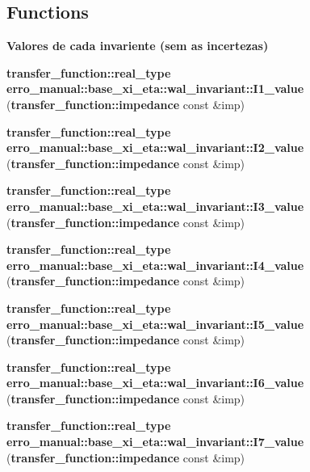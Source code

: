 \subsection*{Functions}
\begin{Indent}{\bf Valores de cada invariente (sem as incertezas)}\par
\begin{CompactItemize}
\item 
{\bf transfer\_\-function::real\_\-type} \textbf{erro\_\-manual::base\_\-xi\_\-eta::wal\_\-invariant::I1\_\-value} ({\bf transfer\_\-function::impedance} const \&imp)\label{namespaceerro__manual_1_1base__xi__eta_1_1wal__invariant_ef17311f213159798c257c41cb0017bc}

\item 
{\bf transfer\_\-function::real\_\-type} \textbf{erro\_\-manual::base\_\-xi\_\-eta::wal\_\-invariant::I2\_\-value} ({\bf transfer\_\-function::impedance} const \&imp)\label{namespaceerro__manual_1_1base__xi__eta_1_1wal__invariant_676afb2c00af7452a8b0cbb28622ae60}

\item 
{\bf transfer\_\-function::real\_\-type} \textbf{erro\_\-manual::base\_\-xi\_\-eta::wal\_\-invariant::I3\_\-value} ({\bf transfer\_\-function::impedance} const \&imp)\label{namespaceerro__manual_1_1base__xi__eta_1_1wal__invariant_d6a23c2ce2bd2cbb198999ae2e3e6d7a}

\item 
{\bf transfer\_\-function::real\_\-type} \textbf{erro\_\-manual::base\_\-xi\_\-eta::wal\_\-invariant::I4\_\-value} ({\bf transfer\_\-function::impedance} const \&imp)\label{namespaceerro__manual_1_1base__xi__eta_1_1wal__invariant_dbe29d5f9de1ab0ad67d12ba4e679b2d}

\item 
{\bf transfer\_\-function::real\_\-type} \textbf{erro\_\-manual::base\_\-xi\_\-eta::wal\_\-invariant::I5\_\-value} ({\bf transfer\_\-function::impedance} const \&imp)\label{namespaceerro__manual_1_1base__xi__eta_1_1wal__invariant_7e136ae4806df372e62e08219aa87db6}

\item 
{\bf transfer\_\-function::real\_\-type} \textbf{erro\_\-manual::base\_\-xi\_\-eta::wal\_\-invariant::I6\_\-value} ({\bf transfer\_\-function::impedance} const \&imp)\label{namespaceerro__manual_1_1base__xi__eta_1_1wal__invariant_4713acaf09a126a8dfbff98bda48a628}

\item 
{\bf transfer\_\-function::real\_\-type} \textbf{erro\_\-manual::base\_\-xi\_\-eta::wal\_\-invariant::I7\_\-value} ({\bf transfer\_\-function::impedance} const \&imp)\label{namespaceerro__manual_1_1base__xi__eta_1_1wal__invariant_ac621bdae48f290e295371c1c24bdad6}


\end{CompactItemize}
\end{Indent}
